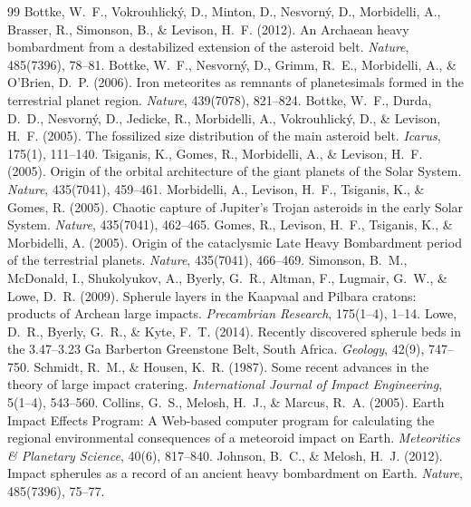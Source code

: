 \documentclass[11pt,a4paper]{article}
\begin{document}
\begin{thebibliography}{99}
 Bottke, W.~F., Vokrouhlick\'y, D., Minton, D., Nesvorn\'y, D., Morbidelli, A., Brasser, R., Simonson, B., \& Levison, H.~F. (2012). An Archaean heavy bombardment from a destabilized extension of the asteroid belt. \textit{Nature}, 485(7396), 78--81.
 Bottke, W.~F., Nesvorn\'y, D., Grimm, R.~E., Morbidelli, A., \& O'Brien, D.~P. (2006). Iron meteorites as remnants of planetesimals formed in the terrestrial planet region. \textit{Nature}, 439(7078), 821--824.
 Bottke, W.~F., Durda, D.~D., Nesvorn\'y, D., Jedicke, R., Morbidelli, A., Vokrouhlick\'y, D., \& Levison, H.~F. (2005). The fossilized size distribution of the main asteroid belt. \textit{Icarus}, 175(1), 111--140.
 Tsiganis, K., Gomes, R., Morbidelli, A., \& Levison, H.~F. (2005). Origin of the orbital architecture of the giant planets of the Solar System. \textit{Nature}, 435(7041), 459--461.
 Morbidelli, A., Levison, H.~F., Tsiganis, K., \& Gomes, R. (2005). Chaotic capture of Jupiter's Trojan asteroids in the early Solar System. \textit{Nature}, 435(7041), 462--465.
 Gomes, R., Levison, H.~F., Tsiganis, K., \& Morbidelli, A. (2005). Origin of the cataclysmic Late Heavy Bombardment period of the terrestrial planets. \textit{Nature}, 435(7041), 466--469.
 Simonson, B.~M., McDonald, I., Shukolyukov, A., Byerly, G.~R., Altman, F., Lugmair, G.~W., \& Lowe, D.~R. (2009). Spherule layers in the Kaapvaal and Pilbara cratons: products of Archean large impacts. \textit{Precambrian Research}, 175(1--4), 1--14.
 Lowe, D.~R., Byerly, G.~R., \& Kyte, F.~T. (2014). Recently discovered spherule beds in the 3.47--3.23 Ga Barberton Greenstone Belt, South Africa. \textit{Geology}, 42(9), 747--750.
 Schmidt, R.~M., \& Housen, K.~R. (1987). Some recent advances in the theory of large impact cratering. \textit{International Journal of Impact Engineering}, 5(1--4), 543--560.
 Collins, G.~S., Melosh, H.~J., \& Marcus, R.~A. (2005). Earth Impact Effects Program: A Web-based computer program for calculating the regional environmental consequences of a meteoroid impact on Earth. \textit{Meteoritics \& Planetary Science}, 40(6), 817--840.
 Johnson, B.~C., \& Melosh, H.~J. (2012). Impact spherules as a record of an ancient heavy bombardment on Earth. \textit{Nature}, 485(7396), 75--77.
\end{thebibliography}
\end{document}
